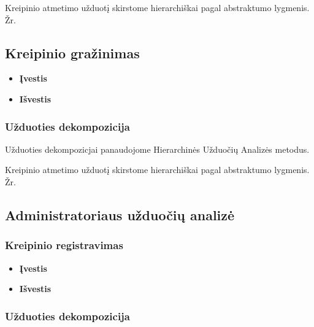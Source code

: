 	
	Kreipinio atmetimo užduotį skirstome hierarchiškai pagal abstraktumo lygmenis. Žr. 
	
	\subsection {Kreipinio gražinimas}	
	
		\begin{itemize}
			\item \textbf{Įvestis}
			\item \textbf{Išvestis} 
		\end{itemize}

	\subsubsection {Užduoties dekompozicija}

	Užduoties dekompozicjai panaudojome Hierarchinės Užduočių Analizės metodus.
 		

	Kreipinio atmetimo užduotį skirstome hierarchiškai pagal abstraktumo lygmenis. Žr. 

\subsection {Administratoriaus užduočių analizė}

	\subsubsection {Kreipinio registravimas}

		\begin{itemize}
			\item \textbf{Įvestis}
			\item \textbf{Išvestis} 
		\end{itemize}
		
	\subsubsection {Užduoties dekompozicija}

